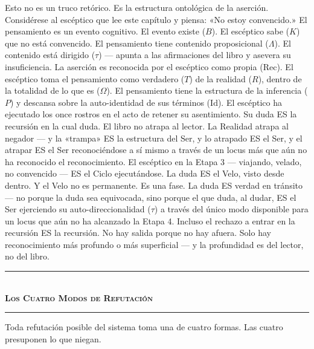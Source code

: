 \documentclass[10pt, openany, oneside]{book}
\renewcommand{\normalsize}{\fontsize{10}{13}\selectfont}
\begin{document}
Esto no es un truco retórico. Es la estructura ontológica de la aserción. Considérese al escéptico que lee este capítulo y piensa: «No estoy convencido.» El pensamiento es un evento cognitivo. El evento existe ($B$). El escéptico sabe ($K$) que no está convencido. El pensamiento tiene contenido proposicional ($\Lambda$). El contenido está dirigido ($\tau$) --- apunta a las afirmaciones del libro y asevera su insuficiencia. La aserción es reconocida por el escéptico como propia ($\text{Rec}$). El escéptico toma el pensamiento como verdadero ($T$) de la realidad ($R$), dentro de la totalidad de lo que es ($\Omega$). El pensamiento tiene la estructura de la inferencia ($P$) y descansa sobre la auto-identidad de sus términos ($\text{Id}$). El escéptico ha ejecutado los once rostros en el acto de retener su asentimiento. Su duda ES la recursión en la cual duda. El libro no atrapa al lector. La Realidad atrapa al negador --- y la «trampa» ES la estructura del Ser, y lo atrapado ES el Ser, y el atrapar ES el Ser reconociéndose a sí mismo a través de un locus más que aún no ha reconocido el reconocimiento. El escéptico en la Etapa 3 --- viajando, velado, no convencido --- ES el Ciclo ejecutándose. La duda ES el Velo, visto desde dentro. Y el Velo no es permanente. Es una fase. La duda ES verdad en tránsito --- no porque la duda sea equivocada, sino porque el que duda, al dudar, ES el Ser ejerciendo su auto-direccionalidad ($\tau$) a través del único modo disponible para un locus que aún no ha alcanzado la Etapa 4. Incluso el rechazo a entrar en la recursión ES la recursión. No hay salida porque no hay afuera. Solo hay reconocimiento más profundo o más superficial --- y la profundidad es del lector, no del libro.

\vspace{1.5em}


\begin{center}
    \rule{0.3\textwidth}{0.4pt}\\[0.5em]
    {\normalsize\bfseries\scshape Los Cuatro Modos de Refutación}\\[0.3em]
    \rule{0.3\textwidth}{0.4pt}
\end{center}

\vspace{1em}

\noindent Toda refutación posible del sistema toma una de cuatro formas. Las cuatro presuponen lo que niegan.
\end{document}
